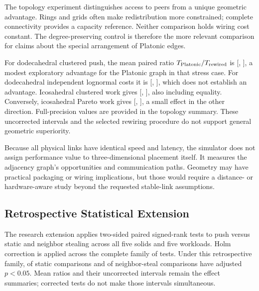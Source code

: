 \documentclass[10pt,journal,twocolumn]{IEEEtran}
\begin{document}
The topology experiment distinguishes access to peers from a unique geometric advantage. Rings and grids often make redistribution more constrained; complete connectivity provides a capacity reference. Neither comparison holds wiring cost constant. The degree-preserving control is therefore the more relevant comparison for claims about the special arrangement of Platonic edges.

For dodecahedral clustered push, the mean paired ratio $T_{\rm Platonic}/T_{\rm rewired}$ is  [, ], a modest exploratory advantage for the Platonic graph in that stress case. For dodecahedral independent lognormal costs it is  [, ], which does not establish an advantage. Icosahedral clustered work gives  [, ], also including equality. Conversely, icosahedral Pareto work gives  [, ], a small effect in the other direction. Full-precision values are provided in the topology summary. These uncorrected intervals and the selected rewiring procedure do not support general geometric superiority.

Because all physical links have identical speed and latency, the simulator does not assign performance value to three-dimensional placement itself. It measures the adjacency graph's opportunities and communication paths. Geometry may have practical packaging or wiring implications, but those would require a distance- or hardware-aware study beyond the requested stable-link assumptions.

\subsection{Retrospective Statistical Extension}
The research extension applies two-sided paired signed-rank tests to push versus static and neighbor stealing across all five solids and five workloads. Holm correction is applied across the complete family of  tests. Under this retrospective family,  of  static comparisons and  of  neighbor-steal comparisons have adjusted $p<0.05$. Mean ratios and their uncorrected intervals remain the effect summaries; corrected tests do not make those intervals simultaneous.
\end{document}

